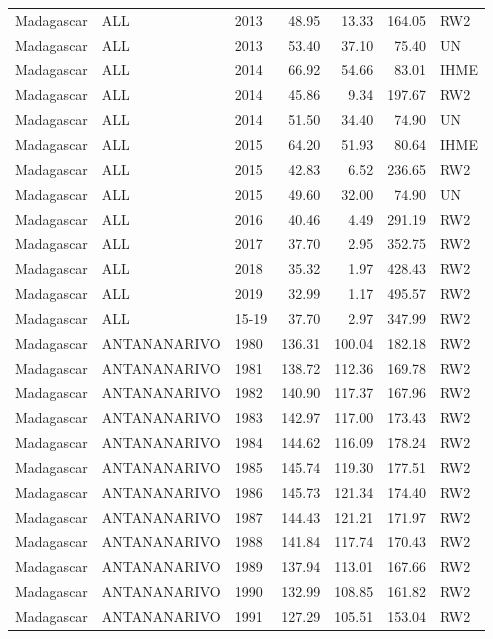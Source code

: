 \begin{longtable}{lllrrrl}
  Madagascar & ALL & 2013 & 48.95 & 13.33 & 164.05 & RW2 \\ 
  Madagascar & ALL & 2013 & 53.40 & 37.10 & 75.40 & UN \\ 
  Madagascar & ALL & 2014 & 66.92 & 54.66 & 83.01 & IHME \\ 
  Madagascar & ALL & 2014 & 45.86 & 9.34 & 197.67 & RW2 \\ 
  Madagascar & ALL & 2014 & 51.50 & 34.40 & 74.90 & UN \\ 
  Madagascar & ALL & 2015 & 64.20 & 51.93 & 80.64 & IHME \\ 
  Madagascar & ALL & 2015 & 42.83 & 6.52 & 236.65 & RW2 \\ 
  Madagascar & ALL & 2015 & 49.60 & 32.00 & 74.90 & UN \\ 
  Madagascar & ALL & 2016 & 40.46 & 4.49 & 291.19 & RW2 \\ 
  Madagascar & ALL & 2017 & 37.70 & 2.95 & 352.75 & RW2 \\ 
  Madagascar & ALL & 2018 & 35.32 & 1.97 & 428.43 & RW2 \\ 
  Madagascar & ALL & 2019 & 32.99 & 1.17 & 495.57 & RW2 \\ 
  Madagascar & ALL & 15-19 & 37.70 & 2.97 & 347.99 & RW2 \\ 
  Madagascar & ANTANANARIVO & 1980 & 136.31 & 100.04 & 182.18 & RW2 \\ 
  Madagascar & ANTANANARIVO & 1981 & 138.72 & 112.36 & 169.78 & RW2 \\ 
  Madagascar & ANTANANARIVO & 1982 & 140.90 & 117.37 & 167.96 & RW2 \\ 
  Madagascar & ANTANANARIVO & 1983 & 142.97 & 117.00 & 173.43 & RW2 \\ 
  Madagascar & ANTANANARIVO & 1984 & 144.62 & 116.09 & 178.24 & RW2 \\ 
  Madagascar & ANTANANARIVO & 1985 & 145.74 & 119.30 & 177.51 & RW2 \\ 
  Madagascar & ANTANANARIVO & 1986 & 145.73 & 121.34 & 174.40 & RW2 \\ 
  Madagascar & ANTANANARIVO & 1987 & 144.43 & 121.21 & 171.97 & RW2 \\ 
  Madagascar & ANTANANARIVO & 1988 & 141.84 & 117.74 & 170.43 & RW2 \\ 
  Madagascar & ANTANANARIVO & 1989 & 137.94 & 113.01 & 167.66 & RW2 \\ 
  Madagascar & ANTANANARIVO & 1990 & 132.99 & 108.85 & 161.82 & RW2 \\ 
  Madagascar & ANTANANARIVO & 1991 & 127.29 & 105.51 & 153.04 & RW2 \\ 

\end{longtable}
